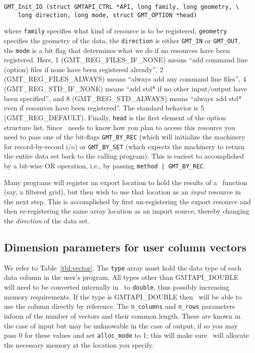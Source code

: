 \documentclass{report}
\begin{document}
\begin{verbatim}
GMT_Init_IO (struct GMTAPI_CTRL *API, long family, long geometry, \
    long direction, long mode, struct GMT_OPTION *head)
\end{verbatim}
where \texttt{family} specifies what kind of resource is to be registered,
\texttt{geometry} specifies the geometry of the data,
the \texttt{direction} is either \texttt{GMT\_IN} or \texttt{GMT\_OUT}, the
\texttt{mode} is a bit flag that determines what we do if no resources have been
registered. Here, 1 (GMT\_REG\_FILES\_IF\_NONE) means ``add command line (option) files if none have been registered already'',
2 (GMT\_REG\_FILES\_ALWAYS) means ``always add any command line files'', 4 (GMT\_REG\_STD\_IF\_NONE) means ``add std* if no other input/output
have been specified'', and 8 (GMT\_REG\_STD\_ALWAYS) means ``always add std* even if resources have been registered''.  The standard
behavior is 5 (GMT\_REG\_DEFAULT).
Finally, \texttt{head} is the first element of the option structure list.
Since \GMT\ needs to know how you plan to access this resource you need to
pass one of the bit-flags \texttt{GMT\_BY\_REC} (which will initialize the
machinery for record-by-record i/o) or \texttt{GMT\_BY\_SET} (which expects
the machinery to return the entire data set back to the calling program).
This is easiest to accomplished by a bit-wise OR operation, i.e., by passing
\texttt{method | GMT\_BY\_REC}.

Many programs will register an export location to hold the results of a \GMT\ function (say,
a filtered grid), but then wish to use that location as an \emph{input} resource in the next
step.  This is accomplished by first un-registering the export resource and then re-registering the same array
location as an import source, thereby changing the \emph{direction} of the data set.

\subsection{Dimension parameters for user column vectors}
We refer to Table~\ref{tbl:vector}.  The \texttt{type} array must hold the
data type of each data column in the user's program.  All types other than GMTAPI\_DOUBLE will need
to be converted internally in \GMT\ to \texttt{double}, thus possibly increasing memory requirements.
If the type is GMTAPI\_DOUBLE then \GMT\ will be able to use the column directly by reference.  The \texttt{n\_columns}
and \texttt{n\_rows} parameters inform of the number of vectors and their common length.  These are known in
the case of input but may be unknowable in the case of output; if so you may pass 0 for these values
and set \texttt{alloc\_mode} to 1; this will make
sure \GMT\ will allocate the necessary memory at the location you specify.
\end{document}
